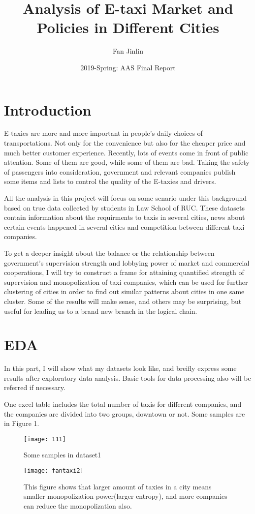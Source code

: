 \documentclass[12pt]{extarticle}
\title{Analysis of E-taxi Market and Policies in Different Cities}
\author{Fan Jinlin}
\date{2019-Spring: AAS Final Report}
\begin{document}
\maketitle

\section{Introduction}
E-taxies are more and more important in people's daily choices of transportations. Not only for the convenience but also for the cheaper price and much better customer experience. Recently, lots of events come in front of public attention. Some of them are good, while some of them are bad. Taking the safety of passengers into consideration, government and relevant companies publish some items and lists to control the quality of the E-taxies and drivers. 

All the analysis in this project will focus on some senario under this background based on true data collected by students in Law School of RUC. These datasets contain information about the requirments to taxis in several cities, news about certain events happened in several cities and competition between different taxi companies.

To get a deeper insight about the balance or the relationship between government's supervision strength and lobbying power of market and commercial cooperations, I will try to construct a frame for attaining quantified strength of supervision and monopolization of taxi companies, which can be used for further clustering of cities in order to find out similar patterns about cities in one same cluster. Some of the results will make sense, and others may be surprising, but useful for leading us to a brand new branch in the logical chain.


\section{EDA}
In this part, I will show what my datasets look like, and breifly express some results after exploratory data analysis. Basic tools for data processing also will be referred if necessary. 

One excel table includes the total number of taxis for different companies, and the companies are divided into two groups, downtown or not. Some samples are in Figure 1.

\begin{figure}
	\centering
	\texttt{[image: 111]}
	\caption{Some samples in dataset1}
	\label{fig:111}
\end{figure}
\begin{figure}
	\centering
	\texttt{[image: fantaxi2]}
	\caption{This figure shows that larger amount of taxies in a city means smaller monopolization power(larger entropy), and more companies can reduce the monopolization also.}
	\label{fig:fantaxi2}
\end{figure}
\end{document}
